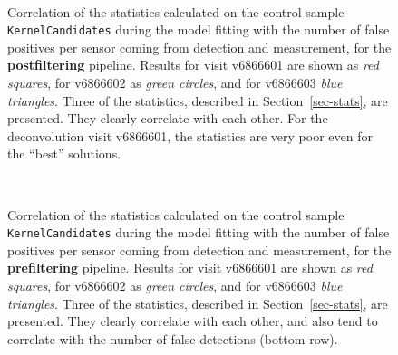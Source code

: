 \documentclass[prd, nofootinbib, floatfix, 11pt,tightenlines,times]{article}
\begin{document}
\begin{figure}
 \\
\caption{Correlation of the statistics calculated on the control
  sample {\tt KernelCandidates} during the model fitting with the
  number of false positives per sensor coming from
  detection and measurement, for the {\bf postfiltering} pipeline.
  Results for visit v6866601 are shown as {\it red squares}, for
  v6866602 as {\it green circles}, and for v6866603 {\it blue
    triangles}.  Three of the statistics, described in
  Section~\ref{sec-stats}, are presented.  They clearly correlate with
  each other.  For the deconvolution visit v6866601, the statistics
  are very poor even for the ``best'' solutions.  
}
\label{corrpost}
\end{figure}

\begin{figure}
 \\
\caption{Correlation of the statistics calculated on the control
  sample {\tt KernelCandidates} during the model fitting with the
  number of false positives per sensor coming from detection and
  measurement, for the {\bf prefiltering} pipeline.  Results for visit
  v6866601 are shown as {\it red squares}, for v6866602 as {\it green
    circles}, and for v6866603 {\it blue triangles}.  Three of the
  statistics, described in Section~\ref{sec-stats}, are presented.
  They clearly correlate with each other, and also tend to correlate
  with the number of false detections (bottom row).}
\label{corrpre}
\end{figure}
\end{document}
